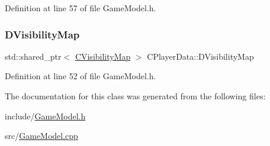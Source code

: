 Definition at line 57 of file Game\+Model.\+h.

\hypertarget{classCPlayerData_a804ea65e7ec7c90b2e335414d106cc78}{}\label{classCPlayerData_a804ea65e7ec7c90b2e335414d106cc78} 
\subsubsection{\texorpdfstring{D\+Visibility\+Map}{DVisibilityMap}}
{\footnotesize\ttfamily std\+::shared\+\_\+ptr$<$ \hyperlink{classCVisibilityMap}{C\+Visibility\+Map} $>$ C\+Player\+Data\+::\+D\+Visibility\+Map\hspace{0.3cm}{\ttfamily [protected]}}



Definition at line 52 of file Game\+Model.\+h.



The documentation for this class was generated from the following files\+:\begin{DoxyCompactItemize}
\item 
include/\hyperlink{GameModel_8h}{Game\+Model.\+h}\item 
src/\hyperlink{GameModel_8cpp}{Game\+Model.\+cpp}\end{DoxyCompactItemize}

